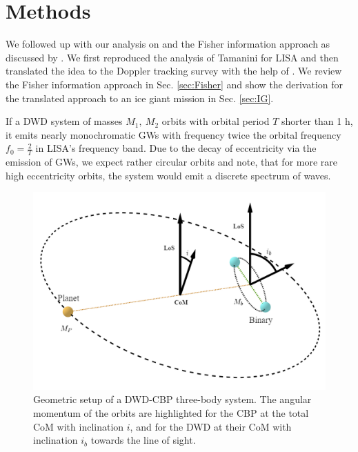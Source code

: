 \documentclass{aa}
\newcommand{\TD}[1]{\textcolor{magenta}{\bf [To do] #1}}
\begin{document}




\section{Methods}
\label{sec:met}

We followed up with our analysis on \citep{tamanini} and the Fisher information approach as discussed by \citep{cutler}. We first reproduced the analysis of Tamanini for LISA and then translated the idea to the Doppler tracking survey with the help of \citep{armstrong}. We review the Fisher information approach in Sec. \ref{sec:Fisher} and show the derivation for the translated approach to an ice giant mission in Sec. \ref{sec:IG}.

If a DWD system of masses $M_1,\ M_2$ orbits with orbital period $T$ shorter than 1 h, it emits nearly monochromatic GWs with frequency twice the orbital frequency $f_0=\frac{2}{T}$ in LISA's frequency band. Due to the decay of eccentricity via the emission of GWs, we expect rather circular orbits and note, that for more rare high eccentricity orbits, the system would emit a discrete spectrum of waves. 

\begin{figure}[h]
    \centering
    \includegraphics[width=.45\textwidth]{Geometry_Exoplanet.png}
    \caption{Geometric setup of a DWD-CBP three-body system. The angular momentum of the orbits are highlighted for the CBP at the total CoM with inclination $i$, and for the DWD at their CoM with inclination $i_b$ towards the line of sight.}
    \label{fig:geometry}
\end{figure}
\end{document}

